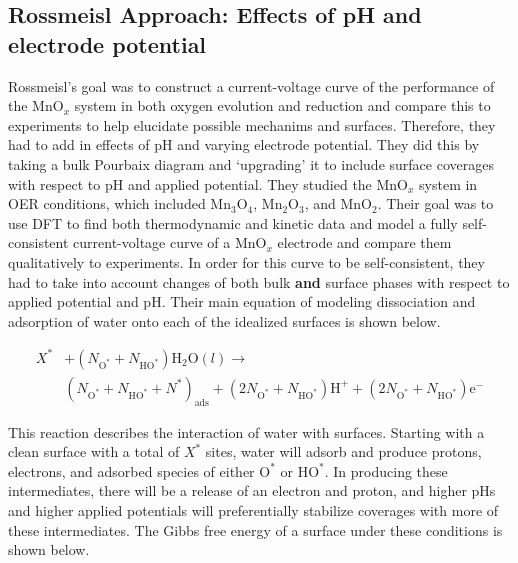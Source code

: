 \documentclass[11pt]{article}
\begin{document}
\subsection{Rossmeisl Approach: Effects of pH and electrode potential}
\label{sec-2-1}

   Rossmeisl's goal was to construct a current-voltage curve of the
   performance of the MnO$_{x}$ system in both oxygen evolution and
   reduction and compare this to experiments to help elucidate
   possible mechanims and surfaces.
   Therefore, they had to add in effects of pH and varying electrode
   potential.
   They did this by taking a bulk Pourbaix diagram and `upgrading' it 
   to include surface coverages with respect to pH and applied potential.
   They studied the MnO$_{x}$ system in OER conditions, which included
   Mn$_{3}$O$_{4}$, Mn$_{2}$O$_{3}$, and MnO$_{2}$.
   Their goal was to use DFT to find both thermodynamic and kinetic data
   and model a fully self-consistent current-voltage curve of a MnO$_{x}$
   electrode and compare them qualitatively to experiments.
   In order for this curve to be self-consistent, they had to take into
   account changes of both bulk \textbf{and} surface phases with respect to
   applied potential and pH.
   Their main equation of modeling dissociation and adsorption of water
   onto each of the idealized surfaces is shown below.
   
   \begin{equation}
   \begin{split}
   X^\ast &+ (N_{\mathrm{O^\ast}} + N_{\mathrm{HO^\ast}})\mathrm{H_2O}(l)
   \rightarrow \\
   & (N_{\mathrm{O^\ast}} + N_{\mathrm{HO^\ast}} +
   N^\ast)_{\mathrm{ads}} + (2N_{\mathrm{O^\ast}} +
   N_{\mathrm{HO^\ast}})\mathrm{H^+} + (2N_{\mathrm{O^\ast}} + N_{\mathrm{HO^\ast}})\mathrm{e^-}
   \end{split}
   \end{equation}
   
   This reaction describes the interaction of water with
   surfaces. 
   Starting with a clean surface with a total of $X^\ast$ sites, water 
   will adsorb and produce protons, electrons, and adsorbed
   species of either $\mathrm{O^{\ast}}$ or $\mathrm{HO^{\ast}}$. 
   In producing these intermediates, there will be a release of an 
   electron and proton, and higher pHs and higher applied potentials 
   will preferentially stabilize coverages with more of these
   intermediates.
   The Gibbs free energy of a surface under these conditions is shown
   below.
   
\end{document}
